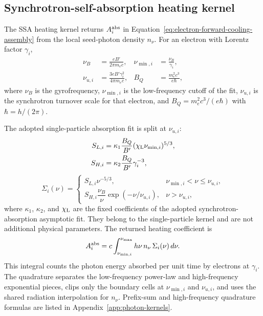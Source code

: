 \documentclass[twocolumn]{aastex702}
\begin{document}
\subsection{Synchrotron-self-absorption heating kernel}

The SSA heating kernel returns \(A_i^{\rm abs}\) in
Equation~\eqref{eq:electron-forward-cooling-assembly} from the local seed-photon
density \(n_\nu\).  For an electron with Lorentz factor \(\gamma_i\),
\begin{equation}
\begin{aligned}
\nu_B&=\frac{eB'}{2\pi m_e c},&
\nu_{\min,i}&=\frac{\nu_B}{\gamma_i},\\
\nu_{u,i}&=\frac{3eB'\gamma_i^2}{4\pi m_e c},&
B_Q&=\frac{m_e^2 c^3}{e\hbar},
\end{aligned}
\label{eq:ssa-frequency-scales}
\end{equation}
where \(\nu_B\) is the gyrofrequency, \(\nu_{\min,i}\) is the low-frequency
cutoff of the fit, \(\nu_{u,i}\) is the synchrotron turnover scale for that
electron, and \(B_Q=m_e^2c^3/(e\hbar)\) with \(\hbar=h/(2\pi)\).

The adopted single-particle absorption fit is split at \(\nu_{u,i}\):
\begin{equation}
\begin{aligned}
S_{L,i}&=\kappa_1\frac{B_Q}{B'}
(\chi_{\rm L}\nu_{\min,i})^{5/3},\\
S_{H,i}&=\kappa_2\frac{B_Q}{B'}\gamma_i^{-3},
\end{aligned}
\end{equation}
\begin{equation}
\Sigma_i(\nu)=
\begin{cases}
S_{L,i}\nu^{-5/3},
& \nu_{\min,i}<\nu\le\nu_{u,i},\\[2ex]
S_{H,i}\dfrac{\nu_B}{\nu}\exp(-\nu/\nu_{u,i}),
& \nu>\nu_{u,i},
\end{cases}
\end{equation}
where \(\kappa_1\), \(\kappa_2\), and \(\chi_{\rm L}\) are the fixed coefficients
of the adopted synchrotron-absorption asymptotic fit.  They belong to the
single-particle kernel and are not additional physical parameters.  The returned
heating coefficient is
\begin{equation}
A_i^{\rm abs}
=c\int_{\nu_{\min,i}}^{\nu_{\max}}
h\nu\,n_\nu\,\Sigma_i(\nu)\,d\nu .
\end{equation}
This integral counts the photon energy absorbed per unit time by electrons at
\(\gamma_i\).  The quadrature separates the low-frequency power-law and
high-frequency exponential pieces, clips only the boundary cells at
\(\nu_{\min,i}\) and \(\nu_{u,i}\), and uses the shared radiation interpolation
for \(n_\nu\).  Prefix-sum and high-frequency quadrature formulas are listed in
Appendix~\ref{app:photon-kernels}.
\end{document}
